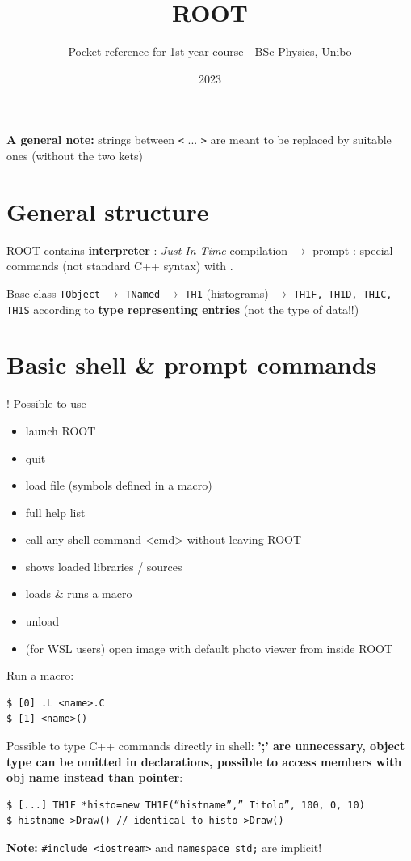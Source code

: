\documentclass[10pt, oneside]{article}
\title{ROOT}
\author{Pocket reference for 1st year course - BSc Physics, Unibo}
\date{2023}
\begin{document}
\maketitle

\tableofcontents
\hfill
\begin{center}
\textbf{A general note:} strings between \texttt{<} ... \texttt{>} are meant to be replaced by suitable ones (without the two kets)
\end{center}
\hfill

\section{General structure}

ROOT contains \textbf{interpreter} : \textit{Just-In-Time} compilation $\rightarrow$ prompt : special commands (not standard C++ syntax) with .

Base class \texttt{TObject} $\rightarrow$ \texttt{TNamed} $\rightarrow$ \texttt{TH1} (histograms) $\rightarrow$ \texttt{TH1F, TH1D, THIC, TH1S} according to \textbf{type representing entries} (not the type of data!!)

\section{Basic shell \& prompt commands}
! Possible to use 
\begin{itemize}
\item {} launch ROOT
\item {} quit
\item {} load file (symbols defined in a macro)
\item {}  full help list
\item {} call any shell command <cmd> without leaving ROOT
\item {} shows loaded libraries / sources
\item {} loads \& runs a macro
\item {} unload
\item {} (for WSL users) open image with default photo viewer from inside ROOT
\end{itemize}
Run a macro:
\begin{verbatim}
$ [0] .L <name>.C
$ [1] <name>()
\end{verbatim}
Possible to type C++ commands directly in shell: \textbf{';' are unnecessary, object type can be omitted in declarations, possible to access members with obj name instead than pointer}:
\begin{verbatim}
$ [...] TH1F *histo=new TH1F(“histname”,” Titolo”, 100, 0, 10)
$ histname->Draw() // identical to histo->Draw()
\end{verbatim}
\textbf{Note:} \texttt{\#include <iostream>} and \texttt{namespace std;} are implicit!
\end{document}
